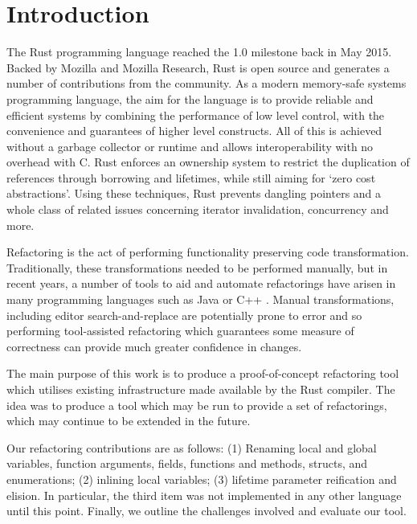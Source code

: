 \section{Introduction}\label{C:intro}

The Rust programming language reached the 1.0 milestone back in May 2015. Backed by Mozilla and Mozilla Research, Rust is open source and generates a number of contributions from the community. As a modern memory-safe systems programming language, the aim for the language is to provide reliable and efficient systems by combining the performance of low level control, with the convenience and guarantees of higher level constructs. All of this is achieved without a garbage collector or runtime and allows interoperability with no overhead with C. Rust enforces an ownership system to restrict the duplication of references through borrowing and lifetimes, while still aiming for `zero cost abstractions'. Using these techniques, Rust prevents dangling pointers and a whole class of related issues concerning iterator invalidation, concurrency and more.

Refactoring is the act of performing functionality preserving code transformation. Traditionally, these transformations needed to be performed manually, but in recent years, a number of tools to aid and automate refactorings have arisen in many programming languages such as Java or C++ \cite{brown2008tool}. Manual transformations, including editor search-and-replace are potentially prone to error and so performing tool-assisted refactoring which guarantees some measure of correctness can provide much greater confidence in changes.

The main purpose of this work is to produce a proof-of-concept refactoring tool which utilises existing infrastructure made available by the Rust compiler. The idea was to produce a tool which may be run to provide a set of refactorings, which may continue to be extended in the future.

Our refactoring contributions are as follows: (1) Renaming local and global variables, function arguments, fields, functions and methods, structs, and enumerations;
(2) inlining local variables;
(3) lifetime parameter reification and elision. In particular, the third item was not implemented in any other language until this point. Finally, we outline the challenges involved and evaluate our tool.